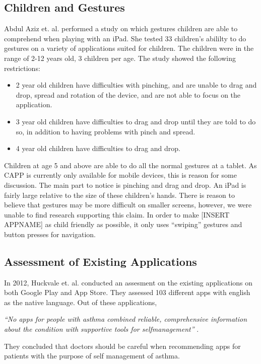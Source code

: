\subsection{Children and Gestures}

Abdul Aziz et. al. \cite{aziz2013children} performed a study on which gestures children are able to comprehend when playing with an iPad. She tested 33 children's abililty to do gestures on a variety of applications suited for children. The children were in the range of 2-12 years old, 3 children per age. The study showed the following restrictions:

\begin{itemize}
  \item 2 year old children have difficulties with pinching, and are unable to drag and drop, spread and rotation of the device, and are not able to focus on the application. 
  \item 3 year old children have difficulties to drag and drop until they are told to do so, in addition to having problems with pinch and spread. 
  \item 4 year old children have difficulties to drag and drop. 
\end{itemize}
Children at age 5 and above are able to do all the normal gestures at a tablet. As CAPP is currently only available for mobile devices, this is reason for some discussion. The main part to notice is pinching and drag and drop. An iPad is fairly large relative to the size of these children's hands. There is reason to believe that gestures may be more difficult on smaller screens, however, we were unable to find research supporting this claim. In order to make [INSERT APPNAME] as child friendly as possible, it only uses ``swiping'' gestures and button presses for navigation.

\subsection{Assessment of Existing Applications}
In 2012, Huckvale et. al. \cite{huckvale2012apps} conducted an assesment on the existing applications on both Google Play and App Store. They assessed 103 different apps with english as the native language. Out of these applications, 


\emph{``No apps for people with asthma combined reliable, comprehensive information about the condition with supportive tools for self­management''} \cite{huckvale2012apps}. 


They concluded that doctors should be careful when recommending apps for patients with the purpose of self management of asthma.
